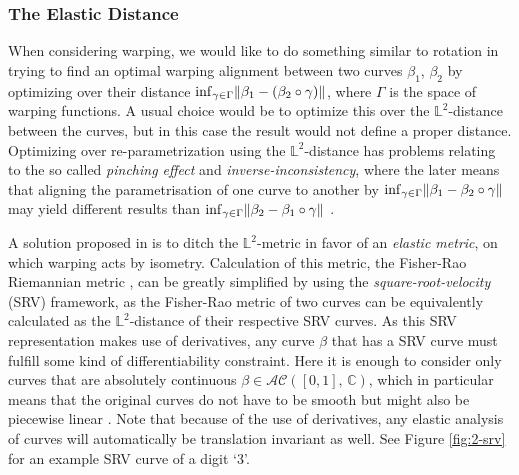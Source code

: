\subsubsection*{The Elastic Distance}
When considering warping, we would like to do something similar to rotation in trying to find an optimal warping alignment between two curves $\beta_1$, $\beta_2$ by optimizing over their distance $\inf_{\gamma \in \Gamma} \lVert\beta_1 - (\beta_2 \circ \gamma)\rVert$, where $\Gamma$ is the space of warping functions.
A usual choice would be to optimize this over the $\mathbb{L}^2$-distance between the curves, but in this case the result would not define a proper distance.
Optimizing over re-parametrization using the $\mathbb{L}^2$-distance has problems relating to the so called \emph{pinching effect} and \emph{inverse-inconsistency}, where the later means that aligning the parametrisation of one curve to another by $\inf_{\gamma \in \Gamma} \lVert\beta_1 - \beta_2 \circ \gamma\rVert$ may yield different results than $\inf_{\gamma \in \Gamma} \lVert\beta_2 - \beta_1 \circ \gamma\rVert$ \parencite[see][88-90]{SrivastavaKlassen2016}.

A solution proposed in \cite{SrivastavaEtAl2011} is to ditch the $\mathbb{L}^2$-metric in favor of an \emph{elastic metric}, on which warping acts by isometry.
Calculation of this metric, the Fisher-Rao Riemannian metric \parencite{Rao1945}, can be greatly simplified by using the \emph{square-root-velocity} (SRV) framework, as the Fisher-Rao metric of two curves can be equivalently calculated as the $\mathbb{L}^2$-distance of their respective SRV curves.
As this SRV representation makes use of derivatives, any curve $\beta$ that has a SRV curve must fulfill some kind of differentiability constraint.
Here it is enough to consider only curves that are absolutely continuous $\beta \in \mathcal{AC}([0,1],\, \mathbb{C})$, which in particular means that the original curves do not have to be smooth but might also be piecewise linear \parencite[see][91]{SrivastavaKlassen2016}.
Note that because of the use of derivatives, any elastic analysis of curves will automatically be translation invariant as well.
See Figure \ref{fig:2-srv} for an example SRV curve of a digit \enquote*{3}.

